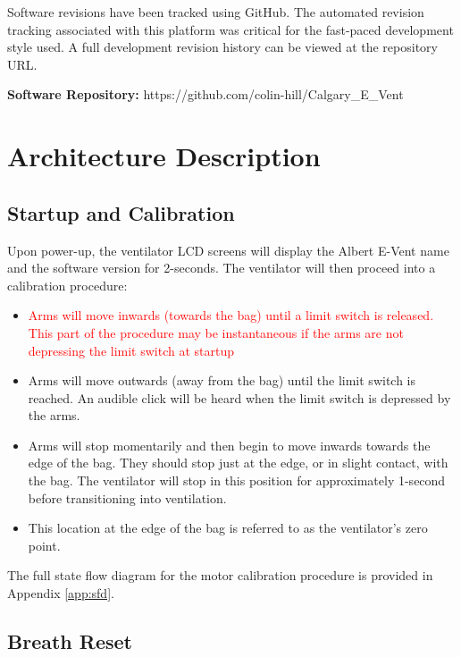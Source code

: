 \documentclass[]{article}
\begin{document}
Software revisions have been tracked using GitHub.  The automated revision tracking associated with this platform was critical for the fast-paced development style used.  A full development revision history can be viewed at the repository URL.
\bigskip

\noindent \textbf{Software Repository:} https://github.com/colin-hill/Calgary\_E\_Vent




\clearpage
\section{Architecture Description}
\label{sect:architecture}



\subsection{Startup and Calibration}
\label{sect:startup_and_cal}

Upon power-up, the ventilator LCD screens will display the Albert E-Vent name and the software version for 2-seconds.  The ventilator will then proceed into a calibration procedure:
\begin{itemize}
	\item \textcolor{red}{Arms will move inwards (towards the bag) until a limit switch is released. This part of the procedure may be instantaneous if the arms are not depressing the limit switch at startup}
	\item Arms will move outwards (away from the bag) until the limit switch is reached.  An audible click will be heard when the limit switch is depressed by the arms.
	\item Arms will stop momentarily and then begin to move inwards towards the edge of the bag.  They should stop just at the edge, or in slight contact, with the bag.  The ventilator will stop in this position for approximately 1-second before transitioning into ventilation.
	\item This location at the edge of the bag is referred to as the ventilator's zero point.
\end{itemize}
The full state flow diagram for the motor calibration procedure is provided in Appendix \ref{app:sfd}.

\subsection{Breath Reset}
\end{document}
